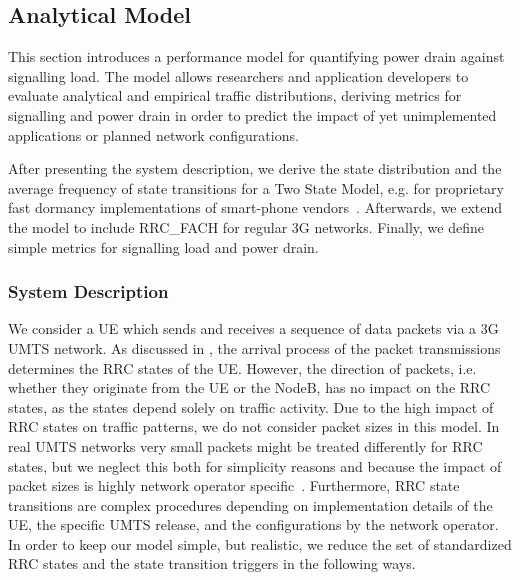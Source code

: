 \subsection{Analytical Model}\label{sec:network:performance_model:analytical_model}
This section introduces a performance model for quantifying power drain against signalling load.
The model allows researchers and application developers to evaluate analytical and empirical traffic distributions, deriving metrics for signalling and power drain in order to predict the impact of yet unimplemented applications or planned network configurations.

After presenting the system description, we derive the state distribution and the average frequency of state transitions for a Two State Model, e.g. for proprietary fast dormancy implementations of smart-phone vendors~\cite{NSN2011}. 
Afterwards, we extend the model to include \gls{RRC_FACH} for regular \gls{3G} networks.
Finally, we define simple metrics for signalling load and power drain.

\newcommand{\PacketIAT}{A}

\subsubsection*{System Description}\label{sec:network:performance_model:analytical_model:system_description}
We consider a \gls{UE} which sends and receives a sequence of data packets via a \gls{3G} \gls{UMTS} network.
As discussed in , the arrival process of the packet transmissions determines the \gls{RRC} states of the \gls{UE}.
However, the direction of packets, i.e. whether they originate from the \gls{UE} or the \gls{NodeB}, has no impact on the \gls{RRC} states, as the states depend solely on traffic activity.
Due to the high impact of \gls{RRC} states on traffic patterns, we do not consider packet sizes in this model.
In real \gls{UMTS} networks very small packets might be treated differently for \gls{RRC} states, but we neglect this both for simplicity reasons and because the impact of packet sizes is highly network operator specific~\cite{Qian2010a}.
Furthermore, \gls{RRC} state transitions are complex procedures depending on implementation details of the \gls{UE}, the specific \gls{UMTS} release, and the configurations by the network operator.
In order to keep our model simple, but realistic, we reduce the set of standardized \gls{RRC} states and the state transition triggers in the following ways. 

